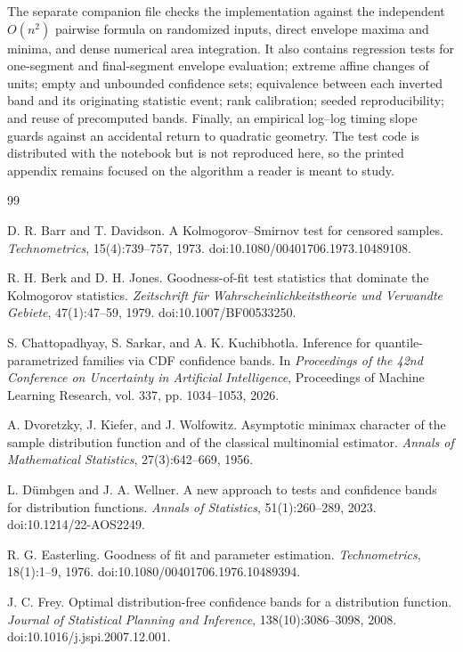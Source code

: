 \documentclass[11pt]{article}
\begin{document}
The separate companion file  checks the
implementation against the independent $O(n^2)$ pairwise formula on
randomized inputs, direct envelope maxima and minima, and dense
numerical area integration.  It also contains regression tests for
one-segment and final-segment envelope evaluation; extreme affine
changes of units; empty and unbounded confidence sets; equivalence
between each inverted band and its originating statistic event; rank
calibration; seeded reproducibility; and reuse of precomputed bands.
Finally, an empirical log--log timing slope guards against an accidental
return to quadratic geometry.  The test code is distributed with the
notebook but is not reproduced here, so the printed appendix remains
focused on the algorithm a reader is meant to study.


\begin{thebibliography}{99}
\small

D. R. Barr and T. Davidson.
A Kolmogorov--Smirnov test for censored samples.
\emph{Technometrics},
15(4):739--757, 1973.
doi:10.1080/00401706.1973.10489108.

R. H. Berk and D. H. Jones.
Goodness-of-fit test statistics that dominate the Kolmogorov statistics.
\emph{Zeitschrift f\"ur Wahrscheinlichkeitstheorie und Verwandte Gebiete},
47(1):47--59, 1979.
doi:10.1007/BF00533250.

S. Chattopadhyay, S. Sarkar, and A. K. Kuchibhotla.
Inference for quantile-parametrized families via CDF confidence bands.
In \emph{Proceedings of the 42nd Conference on Uncertainty in
Artificial Intelligence},
Proceedings of Machine Learning Research, vol. 337,
pp. 1034--1053, 2026.

A. Dvoretzky, J. Kiefer, and J. Wolfowitz.
Asymptotic minimax character of the sample distribution function and
of the classical multinomial estimator.
\emph{Annals of Mathematical Statistics},
27(3):642--669, 1956.

L. D\"umbgen and J. A. Wellner.
A new approach to tests and confidence bands for distribution
functions.
\emph{Annals of Statistics},
51(1):260--289, 2023.
doi:10.1214/22-AOS2249.

R. G. Easterling.
Goodness of fit and parameter estimation.
\emph{Technometrics},
18(1):1--9, 1976.
doi:10.1080/00401706.1976.10489394.

J. C. Frey.
Optimal distribution-free confidence bands for a distribution
function.
\emph{Journal of Statistical Planning and Inference},
138(10):3086--3098, 2008.
doi:10.1016/j.jspi.2007.12.001.


\end{thebibliography}
\end{document}
